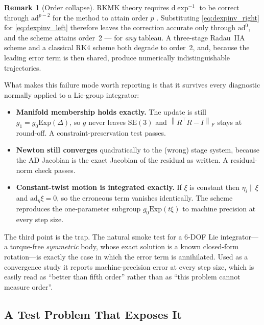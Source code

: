 \documentclass[a4paper,10pt]{article}
\newcommand{\SE}{\mathrm{SE}(3)}
\newcommand{\Exp}{\mathrm{Exp}}
\newcommand{\dexp}{\mathrm{d}\exp}
\newcommand{\ad}{\mathrm{ad}}
\newcommand{\norm}[1]{\left\lVert #1 \right\rVert}
\theoremstyle{definition}
\newtheorem{remark}{Remark}
\begin{document}
\begin{remark}[Order collapse]
\label{rem:order_collapse}
RKMK theory requires $\dexp^{-1}$ to be correct through $\ad^{p-2}$ for the
method to attain order $p$ \citep{muntheKaas1998,iserles2000liegroup}.
Substituting \eqref{eq:dexpinv_right} for \eqref{eq:dexpinv_left} therefore
leaves the correction accurate only through $\ad^0$, and the scheme attains
order~2 --- for \emph{any} tableau.  A three-stage Radau~IIA scheme and a
classical RK4 scheme both degrade to order~2, and, because the leading error
term is then shared, produce numerically indistinguishable trajectories.
\end{remark}

What makes this failure mode worth reporting is that it survives every
diagnostic normally applied to a Lie-group integrator:

\begin{itemize}[leftmargin=*]
  \item \textbf{Manifold membership holds exactly.}  The update is still
    $g_1 = g_0\Exp(\Delta)$, so $g$ never leaves $\SE$ and
    $\norm{R^\top R - I}_F$ stays at round-off.  A constraint-preservation
    test passes.
  \item \textbf{Newton still converges} quadratically to the (wrong) stage
    system, because the AD Jacobian is the exact Jacobian of the residual as
    written.  A residual-norm check passes.
  \item \textbf{Constant-twist motion is integrated exactly.}  If $\xi$ is
    constant then $\eta_i \parallel \xi$ and $\ad_\eta \xi = 0$, so the
    erroneous term vanishes identically.  The scheme reproduces the
    one-parameter subgroup $g_0\Exp(t\xi)$ to machine precision at every step
    size.
\end{itemize}

The third point is the trap.  The natural smoke test for a 6-DOF Lie
integrator---a torque-free \emph{symmetric} body, whose exact solution is a
known closed-form rotation---is exactly the case in which the error term is
annihilated.  Used as a convergence study it reports machine-precision error
at every step size, which is easily read as ``better than fifth order'' rather
than as ``this problem cannot measure order''.

\subsection{A Test Problem That Exposes It}
\label{sec:order_test}
\end{document}
